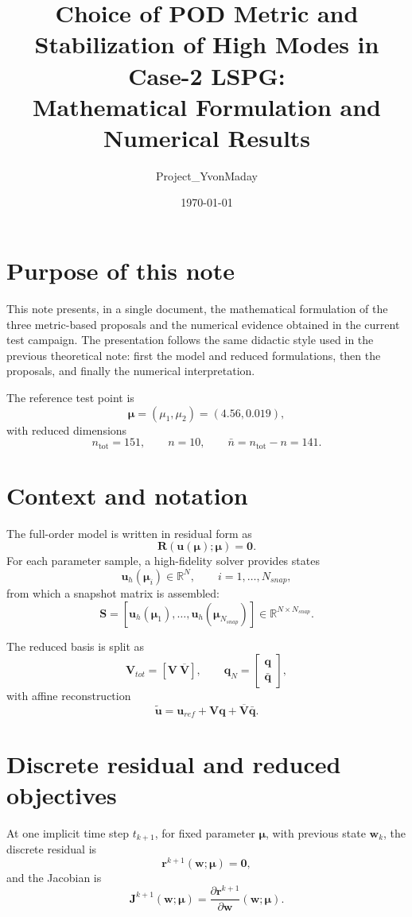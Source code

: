 \documentclass[11pt]{article}
\title{Choice of POD Metric and Stabilization of High Modes in Case-2 LSPG: \\Mathematical Formulation and Numerical Results}
\author{Project\_YvonMaday}
\date{\today}
\begin{document}
\maketitle

\section{Purpose of this note}
This note presents, in a single document, the mathematical formulation of the three metric-based proposals and the numerical evidence obtained in the current test campaign.
The presentation follows the same didactic style used in the previous theoretical note: first the model and reduced formulations, then the proposals, and finally the numerical interpretation.

The reference test point is
\[
\bm\mu=(\mu_1,\mu_2)=(4.56,0.019),
\]
with reduced dimensions
\[
n_{\mathrm{tot}}=151,\qquad n=10,\qquad \bar n=n_{\mathrm{tot}}-n=141.
\]

\section{Context and notation}
The full-order model is written in residual form as
\[
\mathbf R(\mathbf u(\bm\mu);\bm\mu)=\mathbf 0.
\]
For each parameter sample, a high-fidelity solver provides states
\[
\mathbf u_h(\bm\mu_i)\in\mathbb R^N,\qquad i=1,\ldots,N_{snap},
\]
from which a snapshot matrix is assembled:
\[
\mathbf S=[\mathbf u_h(\bm\mu_1),\ldots,\mathbf u_h(\bm\mu_{N_{snap}})]\in\mathbb R^{N\times N_{snap}}.
\]

The reduced basis is split as
\[
\mathbf V_{tot}=[\mathbf V\ \overline{\mathbf V}],
\qquad
\mathbf q_N=\begin{bmatrix}\mathbf q\\ \bar{\mathbf q}\end{bmatrix},
\]
with affine reconstruction
\[
\tilde{\mathbf u}=\mathbf u_{ref}+\mathbf V\mathbf q+\overline{\mathbf V}\bar{\mathbf q}.
\]

\section{Discrete residual and reduced objectives}
At one implicit time step \(t_{k+1}\), for fixed parameter \(\bm\mu\), with previous state \(\mathbf w_k\), the discrete residual is
\[
\mathbf r^{k+1}(\mathbf w;\bm\mu)=\mathbf 0,
\]
and the Jacobian is
\[
\mathbf J^{k+1}(\mathbf w;\bm\mu)=\frac{\partial \mathbf r^{k+1}}{\partial \mathbf w}(\mathbf w;\bm\mu).
\]
\end{document}
